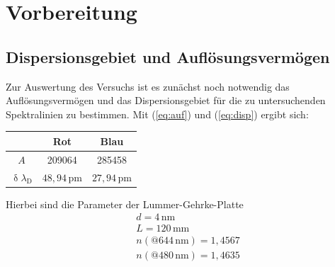 \section{Vorbereitung}
\subsection{Dispersionsgebiet und Auflösungsvermögen}
Zur Auswertung des Versuchs ist es zunächst noch notwendig das Auflösungsvermögen und das Dispersionsgebiet für die zu untersuchenden Spektralinien zu bestimmen. Mit (\ref{eq:auf}) und
(\ref{eq:disp}) ergibt sich:
\begin{table}[]
\centering
\begin{tabular}{c|cc}
 & Rot  & Blau\\
 \hline
$A$ & 209064  & 285458 \\
$\updelta \lambda_\text{D}$ & $48{,}94\,\si{\pico\meter}$ &$27{,}94\,\si{\pico\meter}$
\end{tabular}
\end{table}
Hierbei sind die Parameter der Lummer-Gehrke-Platte
\begin{align}
&d=4\,\si{\nm}\nonumber\\
&L=120\,\si{\mm}\nonumber\\
&n\left(@644\,\si{\nm}\right)=1{,}4567\nonumber\\
&n\left(@480\,\si{\nm}\right)=1{,}4635\nonumber
\end{align}
